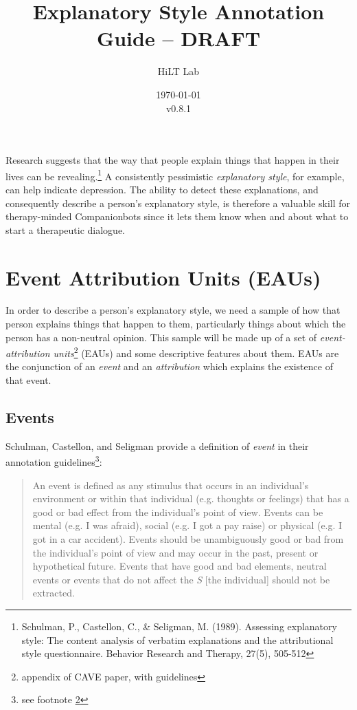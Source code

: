 \documentclass[a4paper,12pt]{article}
\begin{document}
\title{Explanatory Style Annotation Guide -- DRAFT}
\author{HiLT Lab}
\date{\today\\v0.8.1}
\maketitle

\tableofcontents
\break

Research suggests that the way that people explain things that happen in their lives can be revealing.\footnote{\label{seligman89}Schulman, P., Castellon, C., \& Seligman, M. (1989). Assessing explanatory style: The content analysis of verbatim explanations and the attributional style questionnaire. Behavior Research and Therapy, 27(5), 505-512} %
A consistently pessimistic \emph{explanatory style}, for example, can help indicate depression.
The ability to detect these explanations, and consequently describe a person's explanatory style, is therefore a valuable skill for therapy-minded Companionbots since it lets them know when and about what to start a therapeutic dialogue.

\section{Event Attribution Units (EAUs)}
In order to describe a person's explanatory style, we need a sample of how that person explains things that happen to them, particularly things about which the person has a non-neutral opinion. %
This sample will be made up of a set of \emph{event-attribution units}\footnote{\label{CAVE}appendix of CAVE paper, with guidelines} (EAUs) and some descriptive features about them. %
EAUs are the conjunction of an \emph{event} and an \emph{attribution} which explains the existence of that event.


\subsection{Events}

Schulman, Castellon, and Seligman provide a definition of \emph{event} in their annotation guidelines\footnote{see footnote \ref{CAVE}}: %

\begin{quote}
    An event is defined as any stimulus that occurs in an individual's environment or within that individual (e.g. thoughts or feelings) that has a good or bad effect from the individual's point of view.
    Events can be mental (e.g. I was afraid), social (e.g. I got a pay raise) or physical (e.g. I got in a car accident).
    Events should be unambiguously good or bad from the individual's point of view and may occur in the past, present or hypothetical future.
    Events that have good and bad elements, neutral events or events that do not affect the \emph{S} [the individual] should not be extracted.
\end{quote}
\end{document}
